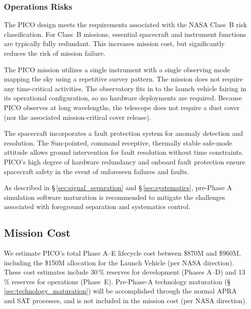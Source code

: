 \subsubsection{Operations Risks}
\label{sec:operations_risks} %

The PICO design meets the requirements associated with the NASA
Class~B risk classification. For Class~B missions, essential
spacecraft and instrument functions are typically fully
redundant. This increases mission cost, but significantly reduces the
risk of mission failure.

The PICO mission utilizes a single instrument with a single observing
mode mapping the sky using a repetitive survey pattern. The mission
does not require any time-critical activities. The observatory fits in
to the launch vehicle fairing in its operational configuration, so no
hardware deployments are required. Because PICO observes at long
wavelengths, the telescope does not require a dust cover (nor the
associated mission-critical cover release).

The spacecraft incorporates a fault protection system for anomaly
detection and resolution. The Sun-pointed, command receptive,
thermally stable safe-mode attitude allows ground intervention for
fault resolution without time constraints. PICO's high degree of
hardware redundancy and onboard fault protection ensure spacecraft
safety in the event of unforeseen failures and faults.

As described in \S\,\ref{sec:signal_separation} and
\S\,\ref{sec:systematics}, pre-Phase A simulation software maturation
is recommended to mitigate the challenges associated with foreground
separation and systematics control.


\subsection{Mission Cost}
\label{sec:mission_cost} %
%
%


We estimate PICO's total Phase A--E lifecycle cost between \$870M and
\$960M, including the \$150M allocation for the Launch Vehicle (per
NASA direction). These cost estimates include 30\,\% reserves for
development (Phases A--D) and 13\,\% reserves for operations
(Phase~E). Pre-Phase-A technology maturation
(\S\,\ref{sec:technology_maturation}) will be accomplished through the
normal APRA and SAT processes, and is not included in the mission cost
(per NASA direction).


